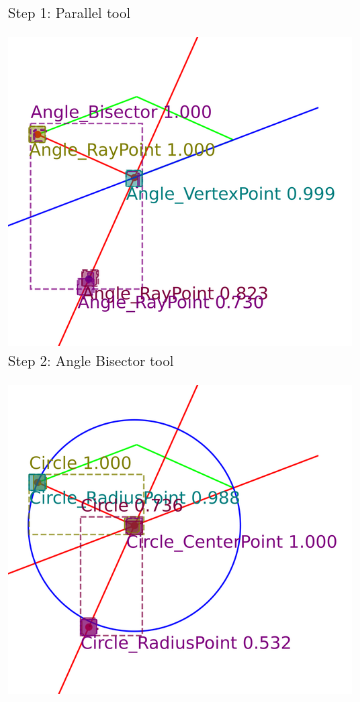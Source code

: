 \begin{figure}[!htb]
\begin{subfigure}[t]{0.32\textwidth}
         \caption{Step 1: Parallel tool}
         \label{fig:Gamma08_example_step1}
     \end{subfigure}
     \hfill
     \begin{subfigure}[t]{0.32\textwidth}
         \centering
         \includegraphics[width=\textwidth]{img/Gamma-08_example/output_image1.png}
         \caption{Step 2: Angle Bisector tool}
         \label{fig:Gamma08_example_step2}
     \end{subfigure}
     \hfill
     \begin{subfigure}[t]{0.32\textwidth}
         \centering
         \includegraphics[width=\textwidth]{img/Gamma-08_example/output_image2.png}

\end{subfigure}
\end{figure}
